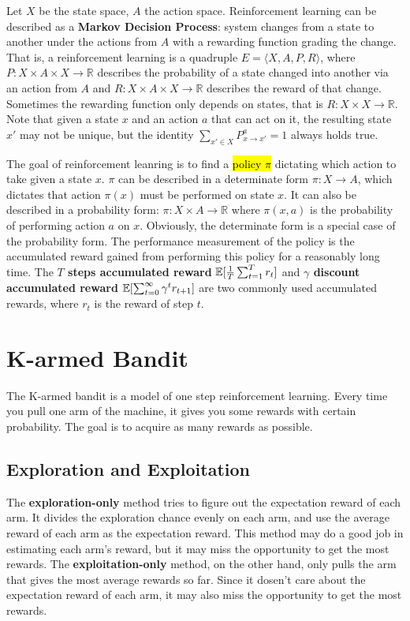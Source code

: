 Let $X$ be the state space, $A$ the action space. Reinforcement learning can be described as a
\textbf{Markov Decision Process}: system changes from a state to another under the actions from $A$ with a 
rewarding function grading the change. That is, a reinforcement learning is a quadruple $E = \langle X, A, P,
R\rangle$, where $P: X \times A \times X \longrightarrow \mathbb{R}$ describes the probability of a state
changed into another via an action from $A$ and $R: X \times A \times X \longrightarrow \mathbb{R}$ describes
the reward of that change. Sometimes the rewarding function only depends on states, that is $R: X \times X
\longrightarrow \mathbb{R}$. Note that given a state $x$ and an action $a$ that can act on it, the resulting 
state $x'$ may not be unique, but the identity $\sum_{x'\in X}P_{x\rightarrow x'}^a = 1$ always holds true.
\par
The goal of reinforcement leanring is to find a \hl{policy $\pi$} dictating which action to take given a state
$x$. $\pi$ can be described in a determinate form $\pi: X \longrightarrow A$, which dictates that action
$\pi(x)$ must be performed on state $x$. It can also be described in a probability form: $\pi: X \times A
\longrightarrow \mathbb{R}$ where $\pi(x, a)$ is the probability of performing action $a$ on $x$. Obviously,
the determinate form is a special case of the probability form. The performance measurement of the policy is 
the accumulated reward gained from performing this policy for a reasonably long time. The \textbf{$T$ steps
accumulated reward} $\operatorname*{\mathbb{E}}[\frac{1}{T}\sum_{t=1}^{T}r_t]$ and \textbf{$\gamma$ discount accumulated reward}
$\operatorname*{\mathbb{E}}[\sum_{t=0}^{\infty}\gamma^t r_{t+1}]$ are two commonly used accumulated rewards, where $r_t$ is the reward
of step $t$.

\section{K-armed Bandit}
The K-armed bandit is a model of one step reinforcement learning. Every time you pull one arm of the machine,
it gives you some rewards with certain probability. The goal is to acquire as many rewards as possible.

\subsection{Exploration and Exploitation}
The \textbf{exploration-only} method tries to figure out the expectation reward of each arm. It divides the 
exploration chance evenly on each arm, and use the average reward of each arm as the expectation reward. This
method may do a good job in estimating each arm's reward, but it may miss the opportunity to get the most 
rewards. The \textbf{exploitation-only} method, on the other hand, only pulls the arm that gives the most 
average rewards so far. Since it dosen't care about the expectation reward of each arm, it may also miss the
opportunity to get the most rewards. 

